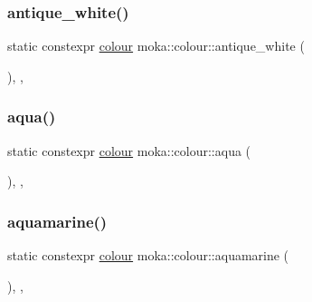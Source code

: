 \mbox{\label{classmoka_1_1colour_a532d207410adfcd06b0f451ac95c666c}} 
\subsubsection{\texorpdfstring{antique\_white()}{antique\_white()}}
{\footnotesize\ttfamily static constexpr \mbox{\hyperlink{classmoka_1_1colour}{colour}} moka\+::colour\+::antique\+\_\+white (\begin{DoxyParamCaption}{ }\end{DoxyParamCaption})\hspace{0.3cm}{\ttfamily [inline]}, {\ttfamily [static]}, {\ttfamily [noexcept]}}

\mbox{\label{classmoka_1_1colour_a4e2f27f7832857daeef115f66549e6bb}} 
\subsubsection{\texorpdfstring{aqua()}{aqua()}}
{\footnotesize\ttfamily static constexpr \mbox{\hyperlink{classmoka_1_1colour}{colour}} moka\+::colour\+::aqua (\begin{DoxyParamCaption}{ }\end{DoxyParamCaption})\hspace{0.3cm}{\ttfamily [inline]}, {\ttfamily [static]}, {\ttfamily [noexcept]}}

\mbox{\label{classmoka_1_1colour_aee9c426d760827fc9f707ff40b8b84db}} 
\subsubsection{\texorpdfstring{aquamarine()}{aquamarine()}}
{\footnotesize\ttfamily static constexpr \mbox{\hyperlink{classmoka_1_1colour}{colour}} moka\+::colour\+::aquamarine (\begin{DoxyParamCaption}{ }\end{DoxyParamCaption})\hspace{0.3cm}{\ttfamily [inline]}, {\ttfamily [static]}, {\ttfamily [noexcept]}}

